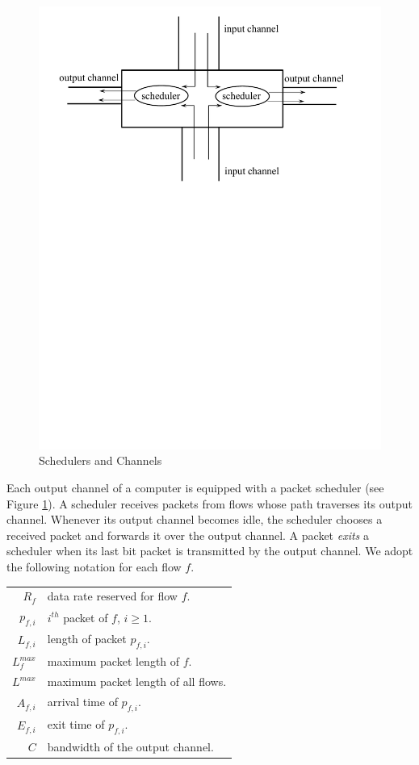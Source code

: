 \documentclass[conference]{IEEEtran}
\begin{document}
\begin{figure}[tb]
\centering
\includegraphics[width=\columnwidth,trim=0in 6.5in 0 0,clip,scale=0.50]{Fig1.pdf}
\caption{Schedulers and Channels}
\label{fig:CobbFig1}
\end{figure}

Each output channel of a computer is equipped with a packet scheduler (see 
Figure \ref{fig:CobbFig1}).  A scheduler receives packets from flows whose path 
traverses its output channel.  Whenever its output channel becomes idle, the 
scheduler chooses a received packet and forwards it over the output channel. A 
packet {\em exits} a scheduler when its last bit packet is transmitted by the 
output channel.  We adopt the following notation for each flow $f$.

\begin{center}
\begin{tabular}{rl}
$R_{f}$ & data rate reserved for flow $f$.
\\
$p_{f,i}$ & $i^{th}$ packet of $f$, $i \geq 1$.
\\
$L_{f,i}$ & length of packet $p_{f,i}$.
\\
$L^{max}_{f}$ & maximum packet length of $f$. 
\\
$L^{max}$ & maximum packet length of all flows.
\\
$A_{f,i}$ & arrival time of $p_{f,i}$.
\\
$E_{f,i}$ & exit time of $p_{f,i}$.
\\
$C$ & bandwidth of the output channel.
\end{tabular}
\end{center}
\end{document}
